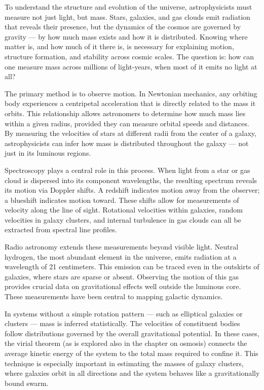 To understand the structure and evolution of the universe, astrophysicists must measure not just light, but mass. Stars, galaxies, and gas clouds emit radiation that reveals their presence, but the dynamics of the cosmos are governed by gravity — by how much mass exists and how it is distributed. Knowing where matter is, and how much of it there is, is necessary for explaining motion, structure formation, and stability across cosmic scales. The question is: how can one measure mass across millions of light-years, when most of it emits no light at all?

The primary method is to observe motion. In Newtonian mechanics, any orbiting body experiences a centripetal acceleration that is directly related to the mass it orbits. This relationship allows astronomers to determine how much mass lies within a given radius, provided they can measure orbital speeds and distances. By measuring the velocities of stars at different radii from the center of a galaxy, astrophysicists can infer how mass is distributed throughout the galaxy — not just in its luminous regions.

Spectroscopy plays a central role in this process. When light from a star or gas cloud is dispersed into its component wavelengths, the resulting spectrum reveals its motion via Doppler shifts. A redshift indicates motion away from the observer; a blueshift indicates motion toward. These shifts allow for measurements of velocity along the line of sight. Rotational velocities within galaxies, random velocities in galaxy clusters, and internal turbulence in gas clouds can all be extracted from spectral line profiles.

Radio astronomy extends these measurements beyond visible light. Neutral hydrogen, the most abundant element in the universe, emits radiation at a wavelength of 21 centimeters. This emission can be traced even in the outskirts of galaxies, where stars are sparse or absent. Observing the motion of this gas provides crucial data on gravitational effects well outside the luminous core. These measurements have been central to mapping galactic dynamics.

In systems without a simple rotation pattern — such as elliptical galaxies or clusters — mass is inferred statistically. The velocities of constituent bodies follow distributions governed by the overall gravitational potential. In these cases, the virial theorem (as is explored also in the chapter on osmosis) connects the average kinetic energy of the system to the total mass required to confine it. This technique is especially important in estimating the masses of galaxy clusters, where galaxies orbit in all directions and the system behaves like a gravitationally bound swarm.


